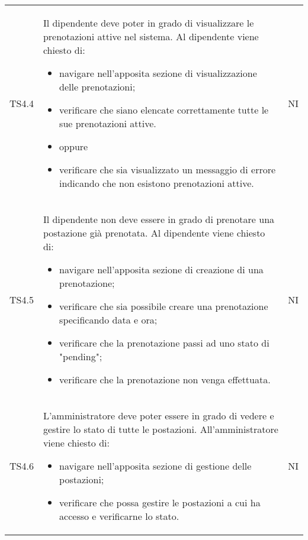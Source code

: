 {\begin{longtable}{ c C{11cm} c }
        TS4.4&
        \begin{flushleft}
            Il dipendente deve poter in grado di visualizzare le prenotazioni attive nel sistema.
            Al dipendente viene chiesto di:
        \end{flushleft}
        \begin{itemize}
            \item navigare nell'apposita sezione di visualizzazione delle prenotazioni;
            \item verificare che siano elencate correttamente tutte le sue prenotazioni attive.
            \item [] oppure
            \item verificare che sia visualizzato un messaggio di errore indicando che non esistono prenotazioni attive.
        \end{itemize}&
        NI\\

        TS4.5&
        \begin{flushleft}
            Il dipendente non deve essere in grado di prenotare una postazione già prenotata.
            Al dipendente viene chiesto di:
        \end{flushleft}
        \begin{itemize}
            \item navigare nell'apposita sezione di creazione di una prenotazione;
            \item verificare che sia possibile creare una prenotazione specificando data e ora;
            \item verificare che la prenotazione passi ad uno stato di "pending";
            \item verificare che la prenotazione non venga effettuata.
        \end{itemize}&
        NI\\

        TS4.6&
        \begin{flushleft}
            L'amministratore deve poter essere in grado di vedere e gestire lo stato di tutte le postazioni.
            All'amministratore viene chiesto di:
        \end{flushleft}
        \begin{itemize}
            \item navigare nell'apposita sezione di gestione delle postazioni;
            \item verificare che possa gestire le postazioni a cui ha accesso e verificarne lo stato.
        \end{itemize}&
        NI\\


\end{longtable}}

